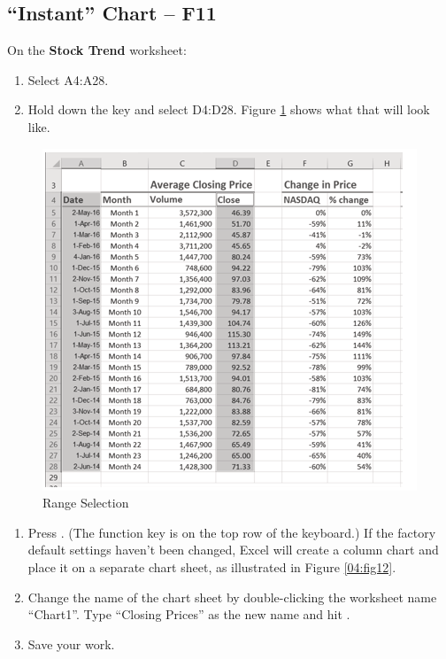 \subsection{``Instant'' Chart – F11}

On the \textbf{Stock Trend} worksheet:

\begin{enumerate}
	\item Select \textsf{A4:A28}.
	\item Hold down the  key and select \textsf{D4:D28}. Figure \ref{04:fig11} shows what that will look like.
\end{enumerate}

\begin{figure}[H]
	\centering
	\includegraphics[width=\maxwidth{.95\linewidth}]{gfx/ch04_fig11}
	\caption{Range Selection}
	\label{04:fig11}
\end{figure}

\begin{enumerate}[resume]
	\item Press . (The  function key is on the top row of the keyboard.) If the factory default settings haven't been changed, Excel will create a column chart and place it on a separate chart sheet, as illustrated in Figure \ref{04:fig12}.
	\item Change the name of the chart sheet by double-clicking the worksheet name ``Chart1''. Type ``Closing Prices'' as the new name and hit .
	\item Save your work.
\end{enumerate}

